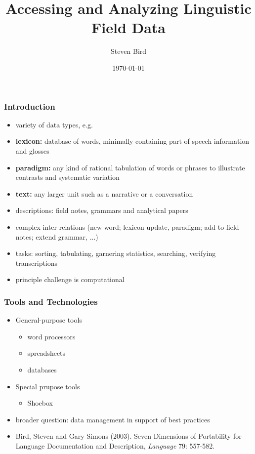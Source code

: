 \documentclass[handout]{beamer}
\title{Accessing and Analyzing Linguistic Field Data}
\author{Steven Bird}
\institute{
  University of Melbourne, AUSTRALIA
}
\date{\today}
\begin{document}
\begin{frame}
  \titlepage
\end{frame}


\begin{frame}
  \frametitle{Introduction}
  \begin{itemize}
  \item variety of data types, e.g.
  \item \textbf{lexicon:} database of words, minimally containing part
    of speech information and glosses
  \item \textbf{paradigm:} any kind of rational
    tabulation of words or phrases to illustrate contrasts and systematic
    variation
  \item \textbf{text:} any larger unit such as a narrative or a
    conversation
  \item descriptions: field notes, grammars and analytical papers
  \item complex inter-relations (new word; lexicon update, paradigm;
    add to field notes; extend grammar, ...)
  \item tasks: sorting, tabulating, garnering statistics, searching,
  verifying transcriptions
  \item principle challenge is computational
  \end{itemize}

\end{frame}

\begin{frame}
\frametitle{Tools and Technologies}
\begin{itemize}
\item General-purpose tools
  \begin{itemize}
  \item word processors
  \item spreadsheets
  \item databases
  \end{itemize}
\item Special prupose tools
  \begin{itemize}
  \item Shoebox
  \end{itemize}
\item broader question: data management in support of best practices
\item Bird, Steven and Gary Simons (2003).  Seven Dimensions of Portability
    for Language Documentation and Description, \textit{Language} 79: 557-582.
\end{itemize}
\end{frame}
\end{document}
